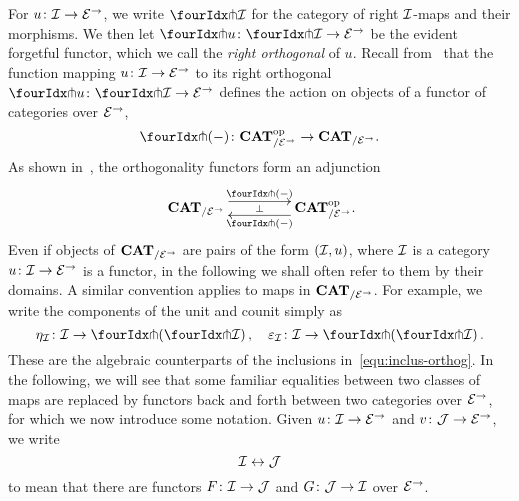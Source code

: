 \documentclass[reqno,10pt,a4paper,oneside,draft]{amsart}
\begin{document}
{{For $u \co \cal{I} \to \catE^\to$, we write $\liftr{\cal{I}}$ for the category of right $\cal{I}$-maps and their morphisms.
We then let $\liftr{u} \co \liftr{\cal{I}} \to \catE^\to$ be the evident forgetful functor, which we call the \emph{right orthogonal} of $u$.
Recall from~\cite{garner:small-object-argument} that the function mapping $u \co \cal{I} \to \catE^\to$ to its right orthogonal $\liftr{u} \co \liftr{\cal{I}} \to \catE^\to$ defines the action on objects of a functor of categories over $\catE^\to$,
\[
\liftr{\brarghole} \co \CAT_{/\catE^\to}^{\op} \to \CAT_{/\catE^\to}
.\]
As shown in~\cite[Proposition~3.8]{garner:small-object-argument}, the orthogonality functors form an adjunction
\begin{equation} \label{garner-adjunction}
\begin{gathered}
\xymatrix@C+2em{
  \CAT_{/\catE^\to}
  \ar@<5pt>[r]^-{\liftl{\brarghole}}
  \ar@{}[r]|-{\bot}
&
  \CAT_{/\catE^\to}^{\op}
  \ar@<5pt>[l]^-{\liftr{\brarghole}}
\rlap{.}}
\end{gathered}
\end{equation}
Even if objects of $\CAT_{/\catE^\to}$ are pairs of the form $(\cal{I}, u)$, where $\cal{I}$ is a category $u \co
\cal{I} \to \catE^\to$ is a functor, in the following we shall often refer to them by their domains.
A similar convention applies to maps in $\CAT_{/\catE^\to}$.
For example, we write the components of the unit and counit simply as
\[
\eta_\cal{I} \co \cal{I} \to \liftl{(\liftr{\cal{I}})}
\, , \quad
\varepsilon_\cal{I} \co \cal{I} \to \liftr{(\liftl{\cal{I}})}
\, .\]
These are the algebraic counterparts of the inclusions in~\eqref{equ:inclus-orthog}.
In the following, we will see that some familiar equalities between two classes of maps are replaced by functors back and forth between two categories over $\cal{E}^\to$, for which we now introduce some notation.
Given $u \co \cal{I} \to \cal{E}^\to$ and $v \co \cal{J} \to \cal{E}^\to$, we write
\begin{equation} \label{equ:logical-equivalence}
\cal{I} \leftrightarrow \cal{J}
\end{equation}
to mean that there are functors $F \co \cal{I} \to \cal{J}$ and $G \co \cal{J} \to \cal{I}$ over $\cal{E}^\to$.

}}
\end{document}
